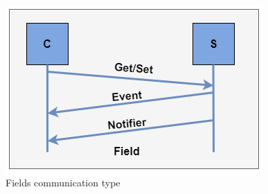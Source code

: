 \begin{figure}[!htb]
	\centering
		\includegraphics{images/Field.png}
	\caption{Fields communication type}
	\label{fig:Field}
\end{figure}








